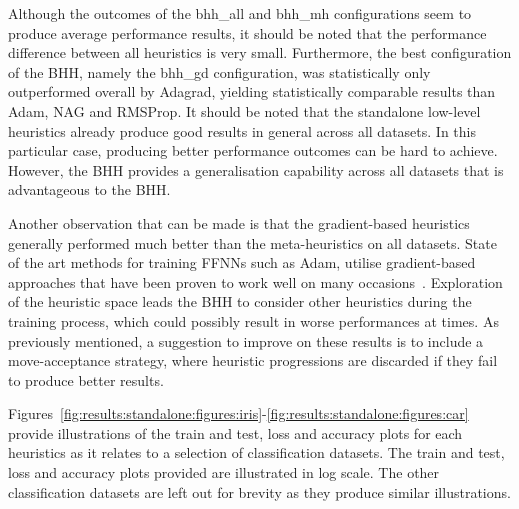Although the outcomes of the bhh\_all and bhh\_mh configurations seem to produce average performance results, it should be noted that the performance difference between all heuristics is very small. Furthermore, the best configuration of the \acs{BHH}, namely the bhh\_gd configuration, was statistically only outperformed overall by \acs{Adagrad}, yielding statistically comparable results than \acs{Adam}, \acs{NAG} and \acs{RMSProp}. It should be noted that the standalone low-level  heuristics already produce good results in general across all datasets. In this particular case, producing better performance outcomes can be hard to achieve. However, the \acs{BHH} provides a generalisation capability across all datasets that is advantageous to the \acs{BHH}.

Another observation that can be made is that the gradient-based heuristics generally performed much better than the meta-heuristics on all datasets. State of the art methods for training \acp{FFNN} such as \acs{Adam}, utilise gradient-based approaches that have been proven to work well on many occasions~\cite{ref:kingma:2014}. Exploration of the heuristic space leads the \acs{BHH} to consider other heuristics during the training process, which could possibly result in worse performances at times. As previously mentioned, a suggestion to improve on these results is to include a move-acceptance strategy, where heuristic progressions are discarded if they fail to produce better results.

Figures~\ref{fig:results:standalone:figures:iris}-\ref{fig:results:standalone:figures:car} provide illustrations of the train and test, loss and accuracy plots for each heuristics as it relates to a selection of classification datasets. The train and test, loss and accuracy plots provided are illustrated in log scale. The other classification datasets are left out for brevity as they produce similar illustrations.


